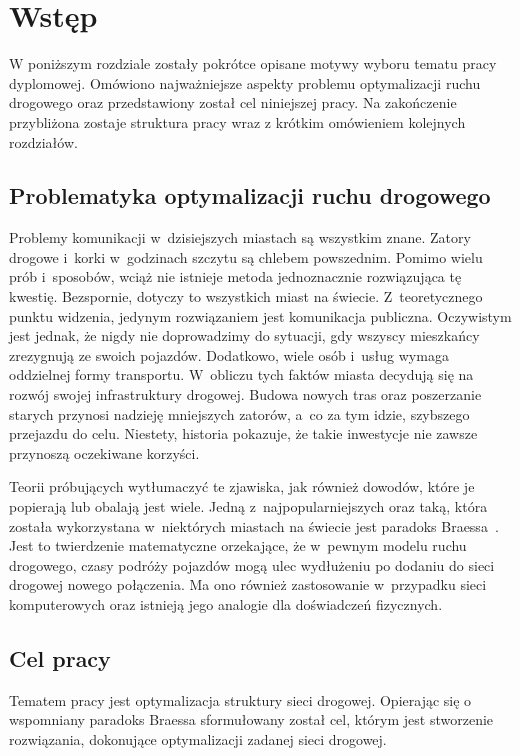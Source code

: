 \documentclass[twoside,12pt]{report}
\let\oldsection\chapter
\def\chapter{\cleardoublepage\oldsection}
\begin{document}


\tableofcontents	%

\chapter{Wstęp}\label{rozdz.wstep} 

W poniższym rozdziale zostały pokrótce opisane motywy wyboru tematu pracy dyplomowej. Omówiono najważniejsze aspekty problemu optymalizacji ruchu drogowego oraz przedstawiony został cel niniejszej pracy. Na zakończenie przybliżona zostaje struktura pracy wraz z krótkim omówieniem kolejnych rozdziałów.

\section{Problematyka optymalizacji ruchu drogowego}
Problemy komunikacji w~dzisiejszych miastach są wszystkim znane. Zatory drogowe i~korki w~godzinach szczytu są chlebem powszednim. Pomimo wielu prób i~sposobów, wciąż nie istnieje metoda jednoznacznie rozwiązująca tę kwestię. Bezspornie, dotyczy to wszystkich miast na świecie. Z~teoretycznego punktu widzenia, jedynym rozwiązaniem jest komunikacja publiczna. Oczywistym jest jednak, że nigdy nie doprowadzimy do sytuacji, gdy wszyscy mieszkańcy zrezygnują ze swoich pojazdów. Dodatkowo, wiele osób i~usług wymaga oddzielnej formy transportu. W~obliczu tych faktów miasta decydują się na rozwój swojej infrastruktury drogowej. Budowa nowych tras oraz poszerzanie starych przynosi nadzieję mniejszych zatorów, a~co za tym idzie, szybszego przejazdu do celu. Niestety, historia pokazuje, że takie inwestycje nie zawsze przynoszą oczekiwane korzyści.

Teorii próbujących wytłumaczyć te zjawiska, jak również dowodów, które je popierają lub obalają jest wiele. Jedną z~najpopularniejszych oraz taką, która została wykorzystana w~niektórych miastach na świecie jest paradoks Braessa~\cite{braess}. Jest to twierdzenie matematyczne orzekające, że w~pewnym modelu ruchu drogowego, czasy podróży pojazdów mogą ulec wydłużeniu po dodaniu do sieci drogowej nowego połączenia. Ma ono również  zastosowanie w~przypadku  sieci komputerowych oraz istnieją jego analogie dla doświadczeń fizycznych.

\section{Cel pracy}
Tematem pracy jest optymalizacja struktury sieci drogowej. Opierając się o wspomniany paradoks Braessa sformułowany został cel, którym jest stworzenie rozwiązania, dokonujące optymalizacji zadanej sieci drogowej. 
\end{document}
